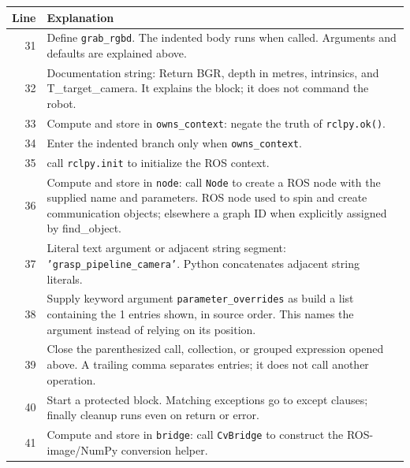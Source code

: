 \documentclass[11pt,a4paper]{book}
\begin{document}
\begin{longtable}{r p{}}

\textbf{Line} & \textbf{Explanation} \\ \hline \endhead

31 & Define \texttt{grab\_rgbd}. The indented body runs when called. Arguments and defaults are explained above. \\

32 & Documentation string: Return BGR, depth in metres, intrinsics, and T\_target\_camera. It explains the block; it does not command the robot. \\

33 & Compute and store in \texttt{owns\_context}: negate the truth of \texttt{rclpy.ok()}.  \\

34 & Enter the indented branch only when \texttt{owns\_context}. \\

35 & call \texttt{rclpy.init} to initialize the ROS context. \\

36 & Compute and store in \texttt{node}: call \texttt{Node} to create a ROS node with the supplied name and parameters. ROS node used to spin and create communication objects; elsewhere a graph ID when explicitly assigned by find\_object. \\

37 & Literal text argument or adjacent string segment: \texttt{'grasp\_pipeline\_camera'}. Python concatenates adjacent string literals. \\

38 & Supply keyword argument \texttt{parameter\_overrides} as build a list containing the 1 entries shown, in source order. This names the argument instead of relying on its position. \\

39 & Close the parenthesized call, collection, or grouped expression opened above. A trailing comma separates entries; it does not call another operation. \\

40 & Start a protected block. Matching exceptions go to except clauses; finally cleanup runs even on return or error. \\

41 & Compute and store in \texttt{bridge}: call \texttt{CvBridge} to construct the ROS-image/NumPy conversion helper.  \\


\end{longtable}
\end{document}
